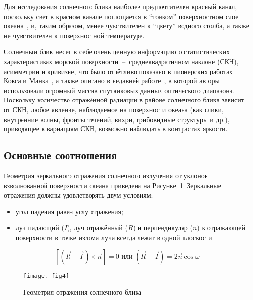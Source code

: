 Для исследования солнечного блика наиболее предпочтителен красный канал, поскольку свет в красном канале поглощается в ``тонком'' поверхностном слое океана~\citep{Jerlov1976}, и, таким образом, менее чувствителен к ``цвету'' водного столба, а также не чувствителен к поверхностной температуре.

Солнечный блик несёт в себе очень ценную информацию о статистических характеристиках морской поверхности~--~среднеквадратичном наклоне (СКН), асимметрии и кривизне, что было отчётливо показано в пионерских работах Кокса и Манка~\citep{Cox1954, Cox1954a, Cox1956}, а также описано в недавней работе~\citep{Breon2006}, в которой авторы использовали огромный массив спутниковых данных оптического диапазона. Поскольку количество отражённой радиации в районе солнечного блика зависит от СКН, любое явление, наблюдаемое на поверхности океана (как слики, внутренние волны, фронты течений, вихри, грибовидные структуры и др.), приводящее к вариациям СКН, возможно наблюдать в контрастах яркости.



\subsection{Основные соотношения}


Геометрия зеркального отражения солнечного излучения от уклонов взволнованной поверхности океана приведена на Рисунке~\ref{fig:4}. Зеркальные отражения должны удовлетворять двум условиям:
\begin{itemize}
	\item угол падения равен углу отражения;
	\item луч падающий ($I$), луч отражённый ($R$) и перпендикуляр ($n$) к отражающей поверхности в точке излома луча всегда лежат в одной плоскости
\end{itemize}



\begin{equation} \label{eq:1.1} 
    \left[\left(\vec{R}-\vec{I}\right)\times \vec{n}\right]=0 \mbox{ или } \left(\vec{R}-\vec{I}\right)=2\vec{n}\cos \omega
\end{equation}


\begin{figure}[!thb]
    \texttt{[image: fig4]}
    \caption{Геометрия отражения солнечного блика}
    \label{fig:4}
\end{figure}

